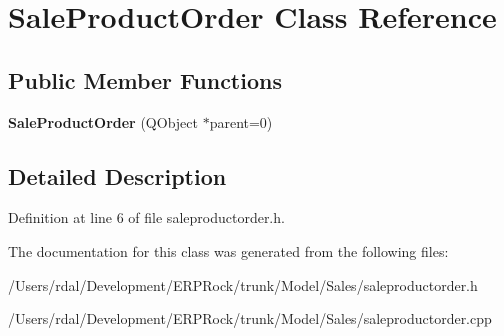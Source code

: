 \hypertarget{class_sale_product_order}{\section{\-Sale\-Product\-Order \-Class \-Reference}
\label{class_sale_product_order}
}
\subsection*{\-Public \-Member \-Functions}
\begin{DoxyCompactItemize}
\item 
\hypertarget{class_sale_product_order_a49dfbb9f58e9a16f5edd470a4d160faa}{{\bfseries \-Sale\-Product\-Order} (\-Q\-Object $\ast$parent=0)}\label{class_sale_product_order_a49dfbb9f58e9a16f5edd470a4d160faa}

\end{DoxyCompactItemize}


\subsection{\-Detailed \-Description}


\-Definition at line 6 of file saleproductorder.\-h.



\-The documentation for this class was generated from the following files\-:\begin{DoxyCompactItemize}
\item 
/\-Users/rdal/\-Development/\-E\-R\-P\-Rock/trunk/\-Model/\-Sales/saleproductorder.\-h\item 
/\-Users/rdal/\-Development/\-E\-R\-P\-Rock/trunk/\-Model/\-Sales/saleproductorder.\-cpp\end{DoxyCompactItemize}
